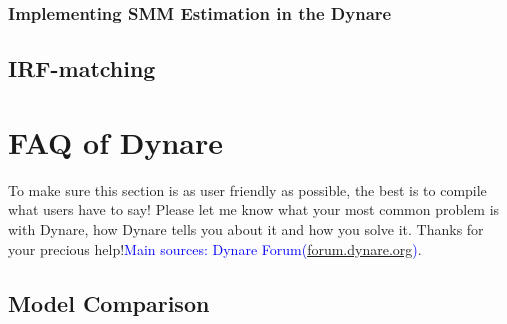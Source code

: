 \documentclass[10pt,math=newtx,citestyle=gb7714-2015,bibstyle=gb7714-2015]{elegantbook}
\begin{document}
{{{	\subsection{Implementing SMM Estimation in the Dynare}
	
	
	
	
	\section{IRF-matching}
	
	
	
	\nocite{*} 
	\printbibliography
	\appendix
	
	\chapter{FAQ of Dynare}
	
	To make sure this section is as user friendly as possible, the best is to compile what users have to say! Please let me know what your most common problem is with Dynare, how Dynare tells you about it and how you solve it. Thanks for your precious help!\textcolor{blue}{Main sources: Dynare Forum(\url{forum.dynare.org})}.
	
	\section{Model Comparison}
	
}}}
\end{document}
